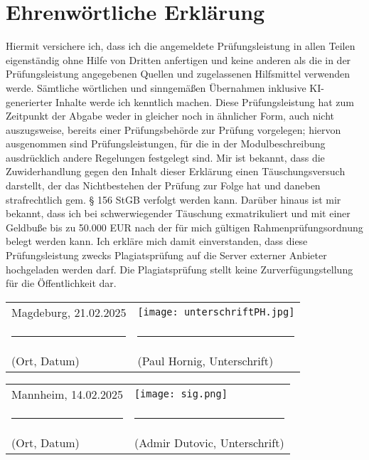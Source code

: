 \newpage
\section*{Ehrenwörtliche Erklärung}

Hiermit versichere ich, dass ich die angemeldete Prüfungsleistung in allen Teilen eigenständig ohne Hilfe von Dritten anfertigen und keine anderen als die in der Prüfungsleistung angegebenen Quellen und zugelassenen Hilfsmittel verwenden werde. Sämtliche wörtlichen und sinngemäßen Übernahmen inklusive KI-generierter Inhalte werde ich kenntlich machen.
Diese Prüfungsleistung hat zum Zeitpunkt der Abgabe weder in gleicher noch in ähnlicher Form, auch nicht auszugsweise, bereits einer Prüfungsbehörde zur Prüfung vorgelegen; hiervon ausgenommen sind Prüfungsleistungen, für die in der Modulbeschreibung ausdrücklich andere Regelungen festgelegt sind.
Mir ist bekannt, dass die Zuwiderhandlung gegen den Inhalt dieser Erklärung einen Täuschungsversuch darstellt, der das Nichtbestehen der Prüfung zur Folge hat und daneben strafrechtlich gem. § 156 StGB verfolgt werden kann. Darüber hinaus ist mir bekannt, dass ich bei schwerwiegender Täuschung exmatrikuliert und mit einer Geldbuße bis zu 50.000 EUR nach der für mich gültigen Rahmenprüfungsordnung belegt werden kann.
Ich erkläre mich damit einverstanden, dass diese Prüfungsleistung zwecks Plagiatsprüfung auf die Server externer Anbieter hochgeladen werden darf. Die Plagiatsprüfung stellt keine Zurverfügungstellung für die Öffentlichkeit dar.

\vspace{1cm}




\begin{tabular}{m{7cm} m{7cm}}
    \vspace{1.3cm}Magdeburg, 21.02.2025 & \vspace{0.1cm} \texttt{[image: unterschriftPH.jpg]} \\
    \multicolumn{1}{c}{\hspace{-2cm}\rule{5cm}{0.4pt}} & \multicolumn{1}{c}{\hspace{-2cm}\rule{5cm}{0.4pt}} \\
    (Ort, Datum) & (Paul Hornig, Unterschrift) \\
\end{tabular}

\begin{tabular}{m{7cm} m{7cm}}
    \vspace{1.3cm}Mannheim, 14.02.2025 & \vspace{0.2cm}\texttt{[image: sig.png]} \\
    \multicolumn{1}{c}{\hspace{-2cm}\rule{5cm}{0.4pt}} & \multicolumn{1}{c}{\hspace{-2cm}\rule{5cm}{0.4pt}} \\
    (Ort, Datum) & (Admir Dutovic, Unterschrift) \\
\end{tabular}
